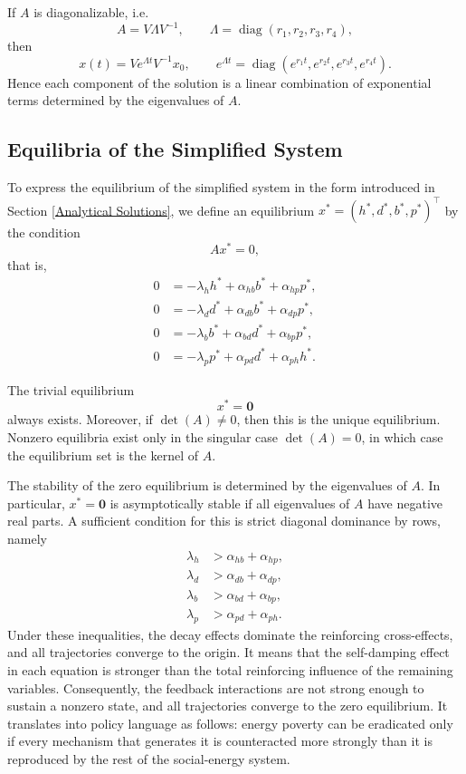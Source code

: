 \documentclass[11pt,a4paper]{article}
\begin{document}
If \(A\) is diagonalizable, i.e.
\[
A=V\Lambda V^{-1},
\qquad
\Lambda=\operatorname{diag}(r_1,r_2,r_3,r_4),
\]
then
\[
x(t)=V e^{\Lambda t} V^{-1}x_0,
\qquad
e^{\Lambda t}=\operatorname{diag}(e^{r_1 t},e^{r_2 t},e^{r_3 t},e^{r_4 t}).
\]
Hence each component of the solution is a linear combination of exponential terms determined by the eigenvalues of \(A\).

\subsection{Equilibria of the Simplified System}

To express the equilibrium of the simplified system in the form introduced in Section \ref{Analytical Solutions}, we define an equilibrium \(x^*=(h^*,d^*,b^*,p^*)^\top\) by the condition
\[
Ax^*=0,
\]
that is,
\begin{align}
0 &= -\lambda_h h^* + \alpha_{hb} b^* + \alpha_{hp} p^*,\\
0 &= -\lambda_d d^* + \alpha_{db} b^* + \alpha_{dp} p^*,\\
0 &= -\lambda_b b^* + \alpha_{bd} d^* + \alpha_{bp} p^*,\\
0 &= -\lambda_p p^* + \alpha_{pd} d^* + \alpha_{ph} h^*.
\end{align}

The trivial equilibrium
\[
x^*=\mathbf{0}
\]
always exists. Moreover, if \(\det(A)\neq 0\), then this is the unique equilibrium. Nonzero equilibria exist only in the singular case \(\det(A)=0\), in which case the equilibrium set is the kernel of \(A\).

The stability of the zero equilibrium is determined by the eigenvalues of \(A\). In particular, \(x^*=\mathbf{0}\) is asymptotically stable if all eigenvalues of \(A\) have negative real parts. A sufficient condition for this is strict diagonal dominance by rows, namely
\begin{align}
\lambda_h &> \alpha_{hb}+\alpha_{hp},\\
\lambda_d &> \alpha_{db}+\alpha_{dp},\\
\lambda_b &> \alpha_{bd}+\alpha_{bp},\\
\lambda_p &> \alpha_{pd}+\alpha_{ph}.
\end{align}
Under these inequalities, the decay effects dominate the reinforcing cross-effects, and all trajectories converge to the origin. It means that the self-damping effect in each equation is stronger than the total reinforcing influence of the remaining variables. Consequently, the feedback interactions are not strong enough to sustain a nonzero state, and all trajectories converge to the zero equilibrium. It translates into policy language as follows: energy poverty can be eradicated only if every mechanism that generates it is counteracted more strongly than it is reproduced by the rest of the social-energy system.
\end{document}

